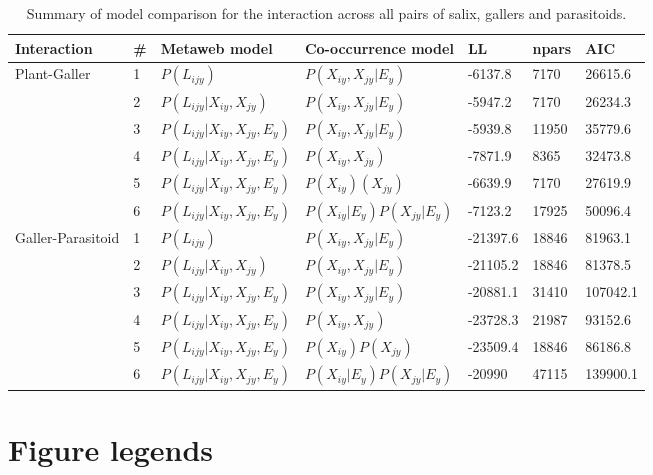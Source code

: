 \documentclass[12pt]{article}
\begin{document}
\begin{landscape}
\begin{table}[]
\centering 
\caption{Summary of model comparison for the interaction across all pairs of salix, gallers and parasitoids.}
\begin{tabular}{lllllll}
\hline
	Interaction & \# & Metaweb model & Co-occurrence model & LL & npars & AIC \\ \hline
	Plant-Galler & 1 & $P(L_{ijy})$ & $P(X_{iy},X_{jy}|E_y)$ & -6137.8 & 7170 & 26615.6 \\ 
	 & 2 & $P(L_{ijy}|X_{iy},X_{jy})$ & $P(X_{iy},X_{jy}|E_y)$ & -5947.2 & 7170 & 26234.3 \\ 
	 & 3 & $P(L_{ijy} | X_{iy}, X_{jy}, E_y)$ & $P(X_{iy},X_{jy}|E_y)$ & -5939.8 & 11950 & 35779.6 \\
	 & 4 & $P(L_{ijy} | X_{iy}, X_{jy}, E_y)$ & $P(X_{iy},X_{jy})$ & -7871.9 & 8365 & 32473.8 \\ 
	 & 5 & $P(L_{ijy} | X_{iy}, X_{jy}, E_y)$ & $P(X_{iy})(X_{jy})$ & -6639.9 & 7170 & 27619.9 \\ 
	 & 6 & $P(L_{ijy} | X_{iy}, X_{jy}, E_y)$ & $P(X_{iy}|E_y)P(X_{jy}|E_y)$ & -7123.2 & 17925 & 50096.4 \\ \hline
	Galler-Parasitoid & 1 & $P(L_{ijy})$ & $P(X_{iy},X_{jy}|E_y)$ & -21397.6 & 18846 & 81963.1 \\ 
	 & 2 & $P(L_{ijy} | X_{iy}, X_{jy})$ & $P(X_{iy},X_{jy}|E_y)$ & -21105.2 & 18846 & 81378.5 \\ 
	 & 3 & $P(L_{ijy} | X_{iy}, X_{jy}, E_y)$ & $P(X_{iy},X_{jy}|E_y)$ & -20881.1 & 31410 & 107042.1 \\ 
	 & 4 & $P(L_{ijy} | X_{iy}, X_{jy}, E_y)$ & $P(X_{iy},X_{jy})$ & -23728.3 & 21987 & 93152.6 \\ 
	 & 5 & $P(L_{ijy} | X_{iy}, X_{jy}, E_y)$ & $P(X_{iy})P(X_{jy})$ & -23509.4 & 18846 & 86186.8 \\ 
	 & 6 & $P(L_{ijy} | X_{iy}, X_{jy}, E_y)$ & $P(X_{iy}|E_y)P(X_{jy}|E_y)$ & -20990 & 47115 & 139900.1 \\ 
\hline
\end{tabular}
\end{table}
\end{landscape}

\newpage
\section*{Figure legends}

\end{document}
